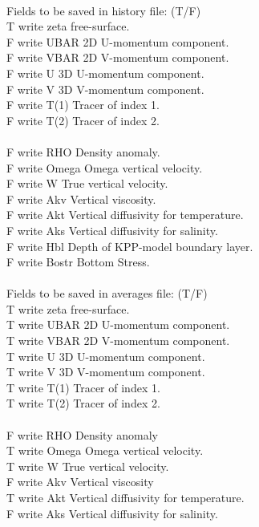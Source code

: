 \\
Fields to be saved in history file: (T/F)\\
T  write zeta  free-surface.\\
F  write UBAR  2D U-momentum component.\\
F  write VBAR  2D V-momentum component.\\
F  write U     3D U-momentum component.\\
F  write V     3D V-momentum component.\\
F  write T(1)  Tracer of index 1.\\
F  write T(2)  Tracer of index 2.\\
\\
F  write RHO   Density anomaly.\\
F  write Omega Omega vertical velocity.\\
F  write W     True vertical velocity.\\
F  write Akv   Vertical viscosity.\\
F  write Akt   Vertical diffusivity for temperature.\\
F  write Aks   Vertical diffusivity for salinity.\\
F  write Hbl   Depth of KPP-model boundary layer.\\
F  write Bostr Bottom Stress.\\
\\
Fields to be saved in averages file: (T/F)\\
T  write zeta  free-surface.\\
T  write UBAR  2D U-momentum component.\\
T  write VBAR  2D V-momentum component.\\
T  write U     3D U-momentum component.\\
T  write V     3D V-momentum component.\\
T  write T(1)  Tracer of index 1.\\
T  write T(2)  Tracer of index 2.\\
\\
F  write RHO   Density anomaly\\
T  write Omega Omega vertical velocity.\\
T  write W     True vertical velocity.\\
F  write Akv   Vertical viscosity\\
T  write Akt   Vertical diffusivity for temperature.\\
F  write Aks   Vertical diffusivity for salinity.\\
